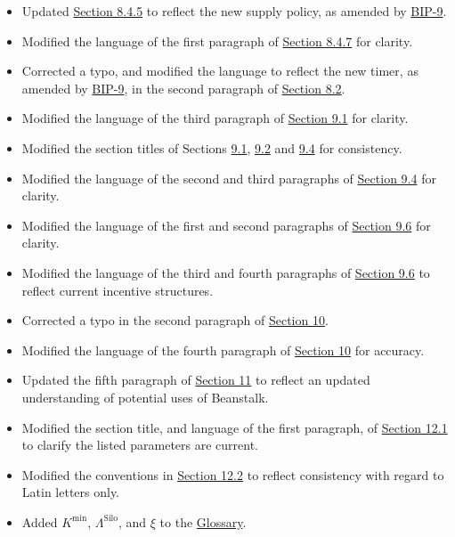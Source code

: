 \documentclass[class=article, crop=false]{standalone}
\begin{document}
\begin{itemize}[topsep=0pt, itemsep=3pt,leftmargin=16pt]
\begin{itemize}
        \item Updated \hyperlink{subsubsection.8.4.5}{Section 8.4.5} to reflect the new  supply policy, as amended by \href{https://github.com/BeanstalkFarms/Beanstalk-Governance-Proposals/blob/master/bip/bip-09-efficiency-improvements.md}{BIP-9}.
        \item Modified the language of the first paragraph of \hyperlink{subsubsection.8.4.7}{Section 8.4.7} for clarity.
        \item Corrected a typo, and modified the language to reflect the new  timer, as amended by \href{https://github.com/BeanstalkFarms/Beanstalk-Governance-Proposals/blob/master/bip/bip-09-efficiency-improvements.md}{BIP-9}, in the second paragraph of \hyperlink{subsection.8.2}{Section 8.2}.
        \item Modified the language of the third paragraph of \hyperlink{subsection.9.1}{Section 9.1} for clarity.
        \item Modified the section titles of Sections \hyperlink{subsection.9.1}{9.1}, \hyperlink{subsection.9.2}{9.2} and \hyperlink{subsection.9.4}{9.4} for consistency.
        \item Modified the language of the second and third paragraphs of \hyperlink{subsection.9.4}{Section 9.4} for clarity.
        \item Modified the language of the first and second paragraphs of \hyperlink{subsection.9.6}{Section 9.6} for clarity.
        \item Modified the language of the third and fourth paragraphs of \hyperlink{subsection.9.6}{Section 9.6} to reflect current incentive structures.
        \item Corrected a typo in the second paragraph of \hyperlink{section.10}{Section 10}.
        \item Modified the language of the fourth paragraph of \hyperlink{section.10}{Section 10} for accuracy.
        \item Updated the fifth paragraph of \hyperlink{section.11}{Section 11} to reflect an updated understanding of potential uses of Beanstalk. 
        \item Modified the section title, and language of the first paragraph, of \hyperlink{subsection.12.1}{Section 12.1} to clarify the listed parameters are current.
        \item Modified the conventions in \hyperlink{subsection.12.2}{Section 12.2} to reflect consistency with regard to Latin letters only.
        \item Added $K^{\text{min}}$, $\Lambda^{\text{Silo}}$, and $\xi$ to the \hyperlink{subsection.12.2}{Glossary}. 

\end{itemize}
\end{itemize}
\end{document}
